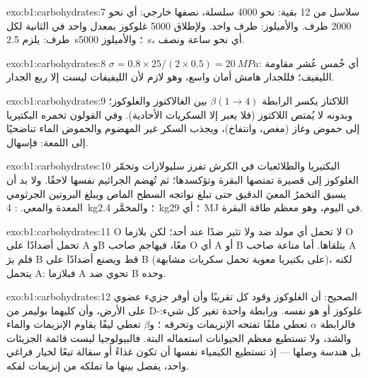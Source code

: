 \begin{solution}{exo:b1:carbohydrates:7}
سلاسل من 12 بقية: نحو \num{4000} سلسلة، نصفها خارجي: أي نحو
\num{2000} طرف. والأميلوز: طرف واحد. ولإطلاق \num{5000} غلوكوز بمعدل
واحد في الثانية لكل طرف: يلزم  \qty{2.5}{s}؛ والأميلوز
\qty{5000}{s}، أي نحو ساعة ونصف.
\end{solution}

\begin{solution}{exo:b1:carbohydrates:8}
$\sigma = 0.8\times 25/(2\times 0.5) = \qty{20}{MPa}$: أي خُمس عُشر
مقاومة الليفيف؛ فللجدار هامش أمان واسع، وهو لازم لأن الليفيفات ليست
إلا ربع الجدار.
\end{solution}

\begin{solution}{exo:b1:carbohydrates:9}
اللاكتاز يكسر الرابطة $\beta(1{\to}4)$ بين الغالاكتوز والغلوكوز؛
وبدونه لا يُمتص اللاكتوز (فلا يعبر  إلا السكريات الأحادية).
وفي القولون تخمره البكتيريا إلى حموض وغاز (مغص، وانتفاخ)، ويجذب
السكر غير المهضوم والحموض الماء تناضحيًا إلى اللمعة: فإسهال.
\end{solution}

\begin{solution}{exo:b1:carbohydrates:10}
البكتيريا والطلائعيات في الكرش تفرز سليولازات وتخمّر الغلوكوز إلى
 قصيرة تمتصها البقرة وتؤكسدها؛ ثم تُهضم الجراثيم نفسها لاحقًا.
ولا بد أن يسبق التخمرُ المعيَ الدقيق حتى تبلغ نواتجه السطح الماص
ويبلغ البروتين الجرثومي المعدة والمعي. : \qty{4}{kg}؛
والمخمَّر \qty{2.4}{kg}؛ أي \qty{29}{MJ} في اليوم، وهو معظم طاقة
البقرة.
\end{solution}

\begin{solution}{exo:b1:carbohydrates:11}
 O لا تحمل أي مولد ضد ولا تثير ضدًا عند أحد؛ لكن بلازما O تحمل
أضدادًا على A وB معًا، فيهاجم صاحب O أي  A أو B يتلقاها. أما
 مناعة صاحب A فلم يرَ B قط ويصنع أضدادًا على B (على بكتيريا
معوية تحمل سكريات مشابهة)، لكنه يتحمل A: فبلازما A تحوي ضد B وحده.
\end{solution}

\begin{solution}{exo:b1:carbohydrates:12}
الصحيح: أن الغلوكوز وقود كل  تقريبًا وأن  أوفر جزيء عضوي
على الأرض، وأن كليهما بوليمر من D-غلوكوز أو هو نفسه. ورابطة واحدة
تغير كل شيء: فالرابطة $\alpha$ تعطي ملفًا تفتحه الإنزيمات وتحرقه ؛
و$\beta$ تعطي ليفًا يقاوم الإنزيمات والماء والشد، ولا تستطيع معظم
الحيوانات استعماله البتة. فالبيولوجيا ليست قائمة الجزيئات بل هندسة
وصلها --- إذ تستطيع الكيمياء نفسها أن تكون غذاءً أو سقالة تبعًا لخيار
فراغي واحد،  يفصل بينها ما تملكه من إنزيمات لفكه.
\end{solution}

